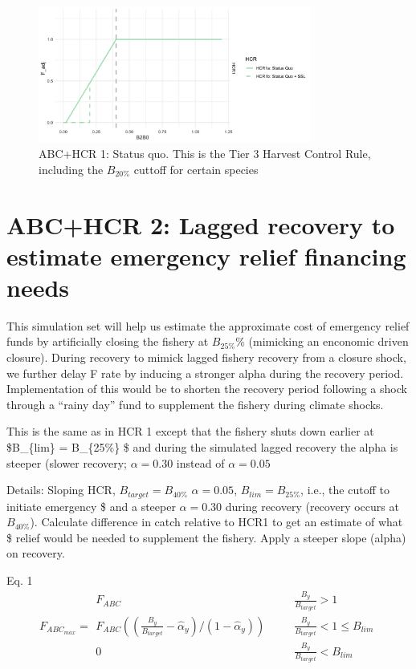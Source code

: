 \documentclass[
]{article}
\begin{document}
\begin{figure}
\centering
\includegraphics[width=0.8\textwidth,height=\textheight]{../../Figs/HCR_figs/HCR1.png}
\caption{ABC+HCR 1: Status quo. This is the Tier 3 Harvest Control Rule,
including the \(B_{20\%}\) cuttoff for certain species}
\end{figure}

\section{ABC+HCR 2: Lagged recovery to estimate emergency relief
financing
needs}\label{abchcr-2-lagged-recovery-to-estimate-emergency-relief-financing-needs}

This simulation set will help us estimate the approximate cost of
emergency relief funds by artificially closing the fishery at
\(B_{25\%}\)\% (mimicking an enconomic driven closure). During recovery
to mimick lagged fishery recovery from a closure shock, we further delay
F rate by inducing a stronger alpha during the recovery period.
Implementation of this would be to shorten the recovery period following
a shock through a ``rainy day'' fund to supplement the fishery during
climate shocks.

This is the same as in HCR 1 except that the fishery shuts down earlier
at \$B\_\{lim\} = B\_\{25\%\} \$ and during the simulated lagged
recovery the alpha is steeper (slower recovery; \(\alpha = 0.30\)
instead of \(\alpha = 0.05\)

Details: Sloping HCR, \(B_{target} = B_{40\%}\) \(\alpha = 0.05\),
\(B_{lim} = B_{25\%}\), i.e., the cutoff to initiate emergency \$ and a
steeper \(\alpha = 0.30\) during recovery (recovery occurs at
\(B_{40\%}\)). Calculate difference in catch relative to HCR1 to get an
estimate of what \$ relief would be needed to supplement the fishery.
Apply a steeper slope (alpha) on recovery.

Eq. 1 \[F_{ABC_{max}} = \begin{array}{ll}  
 F_{ABC} &~~~~~~~~ \frac{B_y}{B_{target}}>1 \\  
 F_{ABC}((\frac{B_y}{B_{target}}-\hat\alpha_y)/(1-\hat\alpha_y)) &~~~~~~~~ \frac{B_y}{B_{target}} < 1 \leq B_{lim} \\ 
 0 &~~~~~~~~ \frac{B_y}{B_{target}} < B_{lim}  
 \end{array}\]
\end{document}
